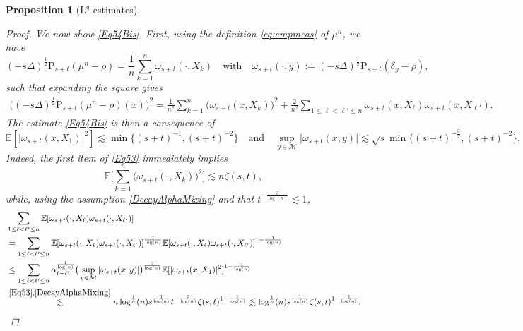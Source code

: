 \documentclass[11pt,a4paper,oneside]{amsart}
\numberwithin{equation}{section}
\newtheorem{proposition}[theorem]{Proposition}
\newcommand{\LL}{\mathrm{L}}
\begin{document}
\begin{proposition}[$\LL^{q}$-estimates]
\begin{proof}
We now show \eqref{Eq54Bis}. First, using the definition \eqref{eq:empmeas} of $\mu^n$, we have
%
\begin{equation}\label{ExpandSquareLaplace}
%
(-s\Delta)^{\frac{1}{2}}\text{P}_{s+t}(\mu^n-\rho)=\frac{1}{n}\sum_{k=1}^n\omega_{s+t}(\cdot,X_k)\quad\text{with}\quad\omega_{s+t}(\cdot,y):=(-s\Delta)^{\frac{1}{2}}\text{P}_{s+t}(\delta_y-\rho),
%
\end{equation}
%
such that expanding the square gives
%
\begin{align*}
%
\Big((-s\Delta)^{\frac{1}{2}}\text{P}_{s+t}(\mu^n-\rho)(x)\Big)^2=\frac{1}{n^2}\sum_{k=1}^n \big(\omega_{s+t}(x,X_k)\big)^2+\frac{2}{n^2}\sum_{1\leq \ell<\ell'\leq n}\omega_{s+t}(x,X_\ell)\omega_{s+t}(x,X_{\ell'}).
%
\end{align*}
%
The estimate \eqref{Eq54Bis} is then a consequence of
%
\begin{equation}\label{Eq53}
\mathbb{E}[\vert\omega_{s+t}(x,X_1)\vert^2]\lesssim \min\Big\{(s+t)^{-1},(s+t)^{-2}\Big\}\quad\text{and}\quad\sup_{y\in\mathcal{M}}\vert\omega_{s+t}(x,y)\vert\lesssim\sqrt{s} \min\Big\{(s+t)^{-\frac{3}{2}},(s+t)^{-2}\Big\}.
\end{equation}
%
Indeed, the first item of \eqref{Eq53} immediately implies
%
$$\mathbb{E}\bigg[\sum_{k=1}^n \big(\omega_{s+t}(\cdot,X_k)\big)^2\bigg]\lesssim n\zeta(s,t),$$
%
while, using the assumption \eqref{DecayAlphaMixing} and that $t^{-\frac{3}{\log(n)}}\lesssim 1$,
%
\begin{equation}\label{Eq53Bis}
%
\begin{aligned}
%
&\sum_{1\leq \ell<\ell'\leq n}\mathbb{E}[\omega_{s+t}(\cdot,X_\ell)\omega_{s+t}(\cdot,X_{\ell'})]\\
&=\sum_{1\leq \ell<\ell'\leq n}\mathbb{E}[\omega_{s+t}(\cdot,X_\ell)\omega_{s+t}(\cdot,X_{\ell'})]^{\frac{1}{\log(n)}}\mathbb{E}[\omega_{s+t}(\cdot,X_\ell)\omega_{s+t}(\cdot,X_{\ell'})]^{1-\frac{1}{\log(n)}}\\
&\leq \sum_{1\leq \ell<\ell'\leq n}\alpha^{\frac{1}{\log(n)}}_{\ell-\ell'}\big(\sup_{y\in\mathcal{M}}\vert \omega_{s+t}(x,y)\vert\big)^{\frac{2}{\log(n)}}\mathbb{E}[\vert \omega_{s+t}(x,X_1)\vert^2]^{1-\frac{1}{\log(n)}}\\
&\stackrel{\eqref{Eq53},\eqref{DecayAlphaMixing}}\lesssim n\log^{\frac{1}{\eta}}(n)s^{\frac{1}{\log(n)}}t^{-\frac{3}{\log(n)}}\zeta(s,t)^{1-\frac{1}{\log(n)}}\lesssim\log^{\frac{1}{\eta}}(n)s^{\frac{1}{\log(n)}}\zeta(s,t)^{1-\frac{1}{\log(n)}}.
%
\end{aligned}
%
\end{equation}


\end{proof}
\end{proposition}
\end{document}
